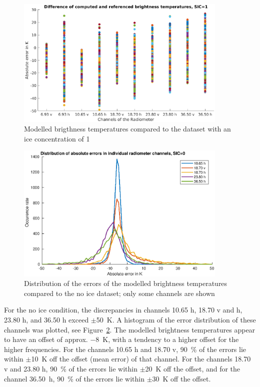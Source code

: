 \documentclass[11pt, a4paper]{article}
\begin{document}
\begin{figure}[h]
   \centering
   \includegraphics[width=0.9\textwidth]{ValidationForward_SIC1.eps}
   \caption{Modelled brigthness temperatures compared to the dataset with an ice concentration of 1}
   \label{fig:for1}
\end{figure}

\begin{figure}[h!]
   \centering
   \includegraphics[width=0.9\textwidth]{ValidationForward_SIC0_errordist.eps}
   \caption{Distribution of the errors of the modelled brightness temperatures compared to the no ice dataset; only some channels are shown}
   \label{fig:for1dist}
\end{figure}

For the no ice condition, the discrepancies in channels 10.65 h, 18.70 v and h, 23.80 h, and 36.50 h exceed \(\pm\)\SI{50}{K}. A histogram of the error distribution of these channels was plotted, see \mbox{Figure \ref{fig:for1dist}}. The modelled brightness temperatures appear to have an offset of approx. \SI{-8}{K}, with a tendency to a higher offset for the higher frequencies. For the channels 10.65 h and 18.70 v, \SI{90}{\percent} of the errors lie within \(\pm\)\SI{10}{K} off the offset (mean error) of that channel. For the channels 18.70 v and 23.80 h, \SI{90}{\percent} of the errors lie within \(\pm\)\SI{20}{K} off the offset, and for the channel \mbox{36.50 h}, \SI{90}{\percent} of the errors lie within \(\pm\)\SI{30}{K} off the offset.
\newline
\end{document}
